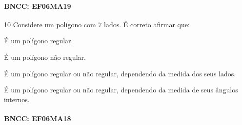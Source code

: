 \paragraph{BNCC: EF06MA19 }


\num{10} Considere um polígono com $7$ lados. É correto afirmar que:

\begin{escolha}
\item É um polígono regular.
\item É um polígono não regular.
\item É um polígono regular ou não regular, dependendo da medida dos seus
lados.
\item É um polígono regular ou não regular, dependendo da medida de seus
ângulos internos.
\end{escolha}

\paragraph{BNCC: EF06MA18}


